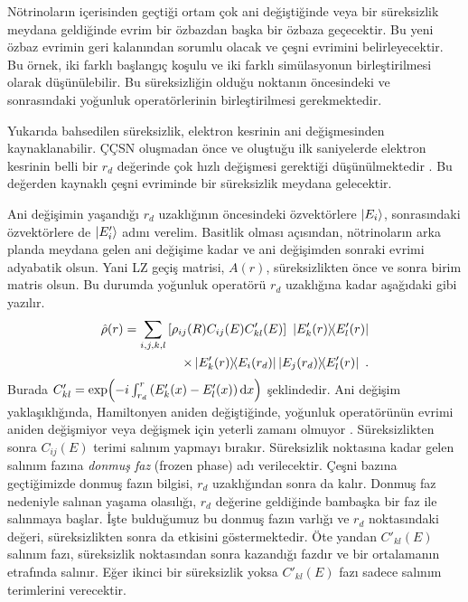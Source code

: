 Nötrinoların içerisinden geçtiği ortam çok ani değiştiğinde veya bir süreksizlik meydana geldiğinde evrim bir özbazdan başka bir özbaza geçecektir. Bu yeni özbaz evrimin geri kalanından sorumlu olacak ve çeşni evrimini belirleyecektir. Bu örnek, iki farklı başlangıç koşulu ve iki farklı simülasyonun birleştirilmesi olarak düşünülebilir. Bu süreksizliğin olduğu noktanın öncesindeki ve sonrasındaki yoğunluk operatörlerinin birleştirilmesi gerekmektedir.

Yukarıda bahsedilen süreksizlik, elektron kesrinin ani değişmesinden kaynaklanabilir. ÇÇSN oluşmadan önce ve oluştuğu ilk saniyelerde elektron kesrinin belli bir $ r_{d} $ değerinde çok hızlı değişmesi gerektiği düşünülmektedir \cite{Athar:1995cx}. Bu değerden kaynaklı çeşni evriminde bir süreksizlik meydana gelecektir. 

Ani değişimin yaşandığı $ r_{d} $ uzaklığının öncesindeki özvektörlere $ \ket{E_{i}} $, sonrasındaki özvektörlere de $ \ket{E'_{i}} $ adını verelim. Basitlik olması açısından, nötrinoların arka planda meydana gelen ani değişime kadar ve ani değişimden sonraki evrimi adyabatik olsun. Yani LZ geçiş matrisi, $ A(r) $, süreksizlikten önce ve sonra birim matris olsun. Bu durumda yoğunluk operatörü $ r_{d} $ uzaklığına kadar aşağıdaki gibi yazılır.
\begin{align}
    \nonumber \hat{\rho}(r) = \sum_{i,j,k,l} \qty[\rho_{ij}(R) C_{ij}(E) C'_{kl}(E)]~ \dyad{E'_{k}(r)}{E'_{l}(r)} \\
    \times \dyad{E'_{k}(r)}{E_{i}(r_{d})} \dyad{E_{j}(r_{d})}{E'_{l}(r)} \text{ .}
\end{align}
Burada $ C'_{kl} = \exp(-i\int^{r}_{r_{d}} \qty(E'_{k}(x)- E'_{l}(x)) \dd{x}) $ şeklindedir. Ani değişim yaklaşıklığında, Hamiltonyen aniden değiştiğinde, yoğunluk operatörünün evrimi aniden değişmiyor veya değişmek için yeterli zamanı olmuyor \cite{messiah2014quantum}. Süreksizlikten sonra $ C_{ij}(E) $ terimi salınım yapmayı bırakır. Süreksizlik noktasına kadar gelen salınım fazına \emph{donmuş faz} (frozen phase) adı verilecektir. Çeşni bazına geçtiğimizde donmuş fazın bilgisi, $ r_{d} $ uzaklığından sonra da kalır. Donmuş faz nedeniyle salınan yaşama olasılığı, $ r_{d} $ değerine geldiğinde bambaşka bir faz ile salınmaya başlar. İşte bulduğumuz bu donmuş fazın varlığı ve $ r_{d} $ noktasındaki değeri, süreksizlikten sonra da etkisini göstermektedir. Öte yandan $ C'_{kl}(E) $ salınım fazı, süreksizlik noktasından sonra kazandığı fazdır ve bir ortalamanın etrafında salınır. Eğer ikinci bir süreksizlik yoksa $ C'_{kl}(E) $ fazı sadece salınım terimlerini verecektir. 

